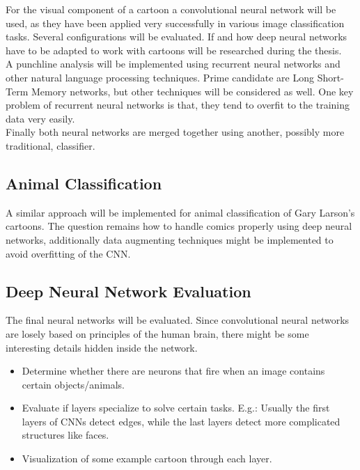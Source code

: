 \documentclass[11pt]{article}
\begin{document}
For the visual component of a cartoon a convolutional neural network will be used, as they have been applied very successfully in various image classification tasks. Several configurations will be evaluated. If and how deep neural networks have to be adapted to work with cartoons will be researched during the thesis.\\

A punchline analysis will be implemented using recurrent neural networks and other natural language processing techniques. Prime candidate are Long Short-Term Memory networks, but other techniques will be considered as well. One key problem of recurrent neural networks is that, they tend to overfit to the training data very easily.\\

Finally both neural networks are merged together using another, possibly more traditional, classifier. \\

\pagebreak
\subsection {Animal Classification}

A similar approach will be implemented for animal classification of Gary Larson's cartoons. The question remains how to handle comics properly using deep neural networks, additionally data augmenting techniques might be implemented to avoid overfitting of the CNN.

\subsection {Deep Neural Network Evaluation}

The final neural networks will be evaluated. Since convolutional neural networks are losely based on principles of the human brain, there might be some interesting details hidden inside the network. 

\begin{itemize}
\item Determine whether there are neurons that fire when an image contains certain objects/animals.
\item Evaluate if layers specialize to solve certain tasks. E.g.: Usually the first layers of CNNs detect edges, while the last layers detect more complicated structures like faces.
\item Visualization of some example cartoon through each layer.
\end{itemize}
\end{document}
